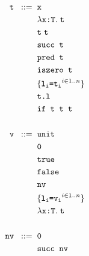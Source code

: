 \documentclass[fleqn, 11pt]{article}
\begin{document}
\begin{align*}
    \texttt{t} \hspace{2mm} ::= \hspace{2mm} &\texttt{x} \\
                                             &\lambda \texttt{x:T} . \hspace{1mm} \texttt{t} \\
                                             &\texttt{t} \hspace{1mm} \texttt{t} \\
                                             &\texttt{succ t} \\
                                             &\texttt{pred t} \\
                                             &\texttt{iszero t} \\
                                             &\{\texttt{l\textsubscript{i}=t\textsubscript{i}}^{i \in 1..n}\} \\
                                             &\texttt{t.l} \\
                                             &\texttt{if t t t} \\ \\
    \texttt{v} \hspace{2mm} ::= \hspace{2mm} &\texttt{unit} \\
                                             &\texttt{0} \\
                                             &\texttt{true} \\
                                             &\texttt{false} \\
                                             &\texttt{nv} \\
                                             &\{\texttt{l\textsubscript{i}=v\textsubscript{i}}^{i \in 1..n}\} \\
                                             &\lambda \texttt{x:T} . \hspace{1mm} \texttt{t} \\ \\
    \texttt{nv} \hspace{2mm} ::= \hspace{2mm} &\texttt{0} \\
                                             &\texttt{succ nv} \\
\end{align*}
\end{document}
